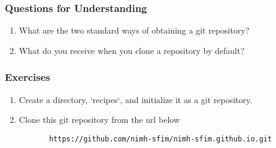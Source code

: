 \subsubsection{Questions for Understanding}
\begin{enumerate}
	\item What are the two standard ways of obtaining a git repository?
	\item What do you receive when you clone a repository by default?
\end{enumerate}

\subsubsection{Exercises}
\begin{enumerate}
\item Create a directory, `recipes`, and initialize it as a git
   repository.
\item Clone this git repository from the url below
   \begin{verbatim}
	   https://github.com/nimh-sfim/nimh-sfim.github.io.git
   \end{verbatim}
\end{enumerate}
